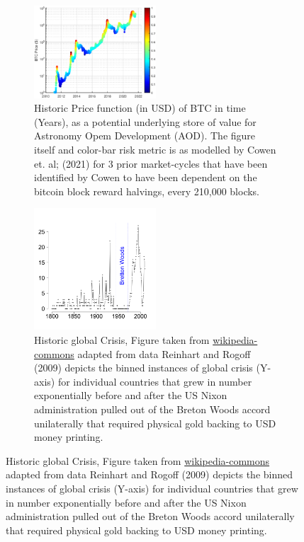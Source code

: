 \documentclass[final,5p,times,twocolumn,authoryear]{elsarticle}
\begin{document}
\begin{figure}[h!]
    \center \begin{figure}[h!]
    \centering
    \label{fig:cowenbtc}
  \caption{Historic Price function (in USD) of BTC in time (Years), as a potential underlying store of value for Astronomy Opem Development (AOD). The figure itself and color-bar risk metric is as modelled by Cowen et. al; (2021) for 3 prior market-cycles that have been identified by Cowen to have been dependent on the bitcoin block reward halvings, every 210,000 blocks.}
  \includegraphics[width=0.5\textwidth]{figs/cowenbtc.eps}
\end{figure}

\begin{figure}[h!]
    \centering
    \label{fig:crisis}
  \caption{Historic global Crisis, Figure taken from \href{https://en.wikipedia.org/wiki/Global_recession}{wikipedia-commons} adapted from data Reinhart and Rogoff (2009) depicts the binned instances of global crisis (Y-axis) for individual countries that grew in number exponentially before and after the US Nixon administration pulled out of the Breton Woods accord unilaterally that required physical gold backing to USD money printing.}
  \includegraphics[width=0.5\textwidth]{figs/330px-BankingCrises.svg.png}
\end{figure}


\end{figure}
\end{document}
